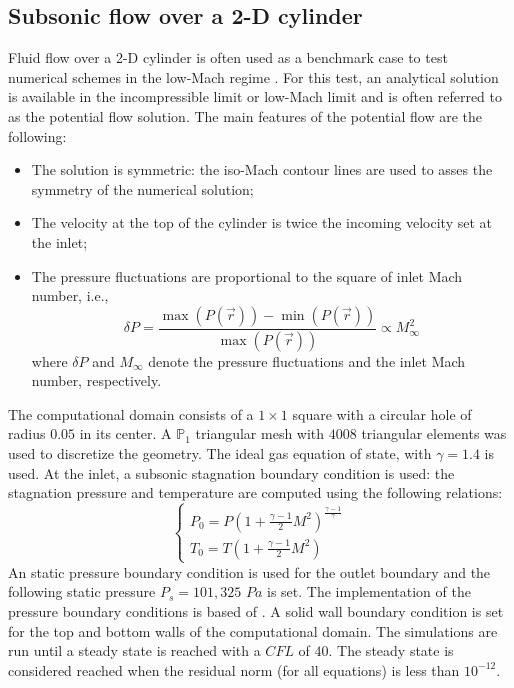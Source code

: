 \subsection{Subsonic flow over a 2-D cylinder} \label{sec:cylinder}
Fluid flow over a 2-D cylinder is often used as a benchmark case to test numerical schemes in the low-Mach regime \cite{LowMach1, LowMach2, LowMach3}. For this test, an analytical solution is available in the incompressible limit or low-Mach limit and is often referred to as the potential flow solution. The main features of the potential flow are the following:
%
\begin{itemize}
\item The solution is symmetric: the iso-Mach contour lines are used to asses the symmetry of the numerical solution;
\item The velocity at the top of the cylinder is twice the incoming velocity set at the inlet;
\item The pressure fluctuations are proportional to the square of inlet Mach number, i.e., 
\begin{equation}
\delta P = \frac{\max(P(\vec{r})) - \min(P(\vec{r}))}{\max(P(\vec{r}))}  \propto M_\infty^2
\end{equation}
where $\delta P$ and $M_\infty$ denote the pressure fluctuations and the inlet Mach number, respectively.
\end{itemize}
%
The computational domain consists of a $1\times 1$ square with a circular hole of radius $0.05$ in its center. A $\mathbb{P}_1$ triangular mesh with $4008$ triangular elements was used to discretize the geometry. The ideal gas equation of state, with $\gamma=1.4$ is used. At the inlet, a subsonic stagnation boundary condition is used: the stagnation pressure and temperature are computed using the following relations:
%
\begin{equation}
\label{eq:stagnation_relations}
\left\{
\begin{array}{l}
P_0 = P\left( 1 + \frac{\gamma-1}{2} M^2 \right)^{\frac{\gamma-1}{\gamma}} \\
T_0 = T\left( 1 + \frac{\gamma-1}{2} M^2 \right)
\end{array}
\right.
\end{equation}
%
An static pressure boundary condition is used for the outlet boundary and the following static pressure $P_s = 101,325$ $Pa$ is set. The implementation of the pressure boundary conditions is based of \cite{SEM}. A solid wall boundary condition is set for the top and bottom walls of the computational domain. The simulations are run until a steady state is reached with a $CFL$ of $40$. The steady state is considered reached when the residual norm  (for all equations) is less than $10^{-12}$.

